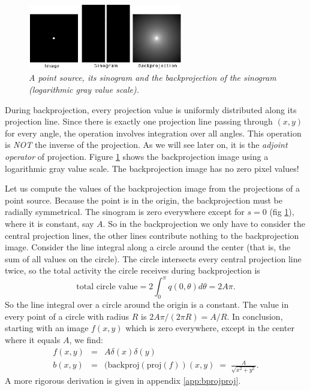 \begin{figure}[tb]
\centering
\includegraphics[width=0.6\textwidth]{figs/fig_backproj.pdf}
\caption{\label{fig:backproj} \emph{A point source, its sinogram and the
backprojection of the sinogram (logarithmic gray value scale).}}
\end{figure}

During backprojection, every projection value is uniformly distributed
along its projection line. Since there is exactly one projection line
passing through $(x,y)$ for every angle, the operation involves
integration over all angles. This operation is {\em NOT} the inverse
of the projection. As we will see later on, it is the {\em adjoint
operator} of projection. Figure \ref{fig:backproj} shows the
backprojection image using a logarithmic gray value scale. The
backprojection image has no zero pixel values!

Let us compute the values of the backprojection image from the
projections of a point source. Because the point is in the origin, the
backprojection must be radially symmetrical. The sinogram is zero
everywhere except for $s = 0$ (fig \ref{fig:backproj}), where it is
constant, say $A$. So in the backprojection we only have to consider the
central projection lines, the other lines contribute nothing to the
backprojection image.  Consider the line integral along a circle
around the center (that is, the sum of all values on the circle). The
circle intersects every central projection line twice, so the total
activity the circle receives during backprojection is
\begin{equation}
  \mbox{total circle value} = 2 \int_0^\pi q(0, \theta) d \theta = 2 A\pi.
  \label{eq:bprojvalue}
\end{equation}
So the line integral over a circle around the origin is a constant. The value
in every point of a circle with radius $R$ is $2 A \pi / (2 \pi R) =
A/R$. In conclusion, starting with an image $f(x,y)$ which is zero everywhere,
except in the center where it equals $A$, we find:
\begin{align}
  f(x,y) & = & A \delta(x) \delta(y)\\
 b(x,y) & = & (\mbox{backproj}(\mbox{proj}(f))(x,y) \; = \;
  \frac{A}{\sqrt{x^2 + y^2}}.
\end{align}
A more rigorous derivation is given in appendix \ref{app:bprojproj}.

